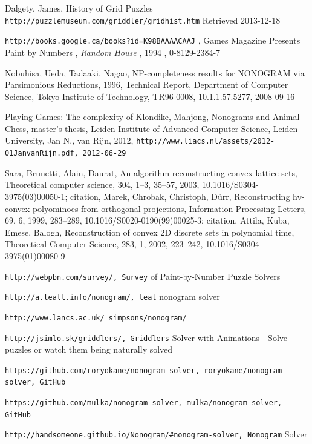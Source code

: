 \begin{thebibliography}{9}


Dalgety, James, History of Grid Puzzles \texttt{http://puzzlemuseum.com/griddler/gridhist.htm} Retrieved 2013-12-18

\texttt{http://books.google.ca/books?id=K98BAAAACAAJ} , Games Magazine Presents Paint by Numbers , \textit{Random House} , 1994 , 0-8129-2384-7

Nobuhisa, Ueda, Tadaaki, Nagao, NP-completeness results for NONOGRAM via Parsimonious Reductions, 1996, Technical Report, Department of Computer Science, Tokyo Institute of Technology, TR96-0008,  10.1.1.57.5277, 2008-09-16

Playing Games: The complexity of Klondike, Mahjong, Nonograms and Animal Chess, master's thesis, Leiden Institute of Advanced Computer Science, Leiden University, Jan N., van Rijn, 2012, \texttt{http://www.liacs.nl/assets/2012-01JanvanRijn.pdf, 2012-06-29}

Sara, Brunetti, Alain, Daurat, An algorithm reconstructing convex lattice sets, Theoretical computer science, 304, 1–3, 35–57, 2003, 10.1016/S0304-3975(03)00050-1; {{citation, Marek, Chrobak, Christoph, Dürr, Reconstructing hv-convex polyominoes from orthogonal projections, Information Processing Letters, 69, 6, 1999, 283–289, 10.1016/S0020-0190(99)00025-3}}; {citation, Attila, Kuba, Emese, Balogh, Reconstruction of convex 2D discrete sets in polynomial time, Theoretical Computer Science, 283, 1, 2002, 223–242, 10.1016/S0304-3975(01)00080-9}

\texttt{http://webpbn.com/survey/, Survey} of Paint-by-Number Puzzle Solvers

\texttt{http://a.teall.info/nonogram/, teal} nonogram solver

\texttt{http://www.lancs.ac.uk/~simpsons/nonogram/}

\texttt{http://jsimlo.sk/griddlers/, Griddlers} Solver with Animations - Solve puzzles or watch them being naturally solved

\texttt{https://github.com/roryokane/nonogram-solver, roryokane/nonogram-solver, GitHub}

\texttt{https://github.com/mulka/nonogram-solver, mulka/nonogram-solver, GitHub}

\texttt{http://handsomeone.github.io/Nonogram/\#nonogram-solver, Nonogram} Solver


\end{thebibliography}
